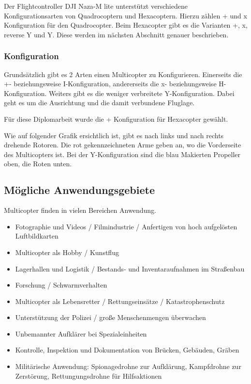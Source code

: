   Der Flightcontroller DJI Naza-M lite unterstützt verschiedene Konfigurationsarten von Quadrocoptern und Hexacoptern. Hierzu zählen + und x Konfiguration für den Quadrocopter. Beim Hexacopter gibt es die Varianten +, x, reverse Y und Y. Diese werden im nächsten Abschnitt genauer beschrieben. \cite{NAZA_Konfig}

  \subsubsection{Konfiguration}
  Grundsätzlich gibt es 2 Arten einen Multicopter zu Konfigurieren.
  Einerseits die +- beziehungsweise I-Konfiguration, andererseits die x- beziehungsweise H-Konfiguration. Weiters gibt es die weniger verbreitete Y-Konfiguration. Dabei geht es um die Ausrichtung und die damit verbundene Fluglage. 

  Für diese Diplomarbeit wurde die + Konfiguration für Hexacopter gewählt.

  Wie auf folgender Grafik ersichtlich ist, gibt es nach links und nach rechts drehende Rotoren. Die rot gekennzeichneten Arme geben an, wo die Vorderseite des Multicopters ist. Bei der Y-Konfiguration sind die blau Makierten Propeller oben, die Roten unten.


  \subsection{Mögliche Anwendungsgebiete}
  Multicopter finden in vielen Bereichen Anwendung. \cite{copterAnwendung}
  \begin{itemize}
    \item Fotographie und Videos / Filmindustrie / Anfertigen von hoch aufgelösten Luftbildkarten
    \item Multicopter als Hobby / Kunstflug
    \item Lagerhallen und Logistik / Bestands- und Inventaraufnahmen im Straßenbau
    \item Forschung / Schwarmverhalten
    \item Multicopter als Lebensretter / Rettungseinsätze / Katastrophenschutz
    \item Unterstützung der Polizei / große Menschenmengen überwachen
    \item Unbemannter Aufklärer bei Spezialeinheiten
    \item Kontrolle, Inspektion und Dokumentation von Brücken, Gebäuden, Gräben
    \item Militärische Anwendung: Spionagedrohne zur Aufklärung, Kampfdrohne zur Zerstörung, Rettungungsdrohne für Hilfsaktionen
  \end{itemize}  
  

